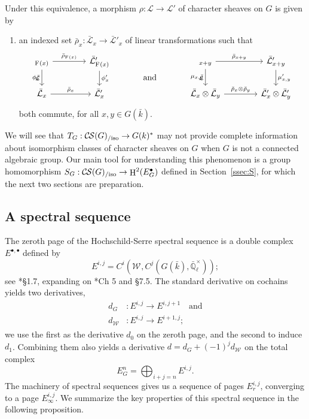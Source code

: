 \documentclass[10pt]{amsart}
\makeatletter
\theoremstyle{plain}
\theoremstyle{definition}
\theoremstyle{remark}
\newcommand{\EE}{\mathbb{\bar Q}_\ell}
\newcommand{\bFq}{\bar{k}}
\newcommand{\Fq}{k}
\newcommand{\EEx}{\EE^\times}
\newcommand{\Weil}[1]{\mathcal{W}_{#1}}
\newcommand{\Frob}[1]{\operatorname{F}_{#1}}
\DeclareMathOperator{\Hh}{H}
\newcommand{\TrFrob}[1]{T_{#1}}
\newcommand{\cs}[1]{{\mathcal{#1}}}
\newcommand{\gcs}[1]{{\mathcal{\bar #1}}}
\newcommand{\CS}{{\mathcal{C\hskip-0.8pt S}}}
\newcommand{\CSiso}[1]{\CS(#1)_{/\text{iso}}}
\newcommand{\labitem}[2]{
\def\@itemlabel{\textbf{#1}}
\item
\def\@currentlabel{#1}\label{#2}}
\newcommand{\brho}{{\bar\rho}}
\makeatother
\begin{document}
Under this equivalence, a morphism $\rho : \cs{L} \to \cs{L'}$ of character sheaves on $G$ is given by
\begin{enumerate}
 \labitem{(cs.4)}{cs.4} an indexed set $\brho_x : \gcs{L}_x \to \gcs{L'}_x$
  of linear transformations such that
  \[
   \begin{tikzcd}[column sep=40]
    \arrow[swap]{d}{\phi_x} \gcs{L}_{\Frob{}(x)} \rar{\brho_{\Frob{}(x)}} & \gcs{L'}_{\Frob{}(x)} \dar{\phi_x'}
    &\arrow[draw=none]{d}[pos=.4,description]{\text{\normalsize{and}}}
    & \arrow[swap]{d}{\mu_{x,y}} \gcs{L}_{x+y} \rar{\brho_{x+y}} & \gcs{L'}_{x+y} \dar{\mu'_{x,y}} \\
    \gcs{L}_x \rar{\brho_x} & \gcs{L'}_x
    & {} & \gcs{L}_x\otimes\gcs{L}_y \rar{\brho_x\otimes\brho_y} & \gcs{L'}_x \otimes\gcs{L'}_y
   \end{tikzcd}
  \]
  both commute, for all $x, y \in G(\bFq)$.
\end{enumerate}

We will see that $\TrFrob{G} : \CSiso{G} \to G(\Fq)^*$ may not provide complete
information about isomorphism classes of character sheaves on $G$ when $G$ is not a connected algebraic group.
Our main tool for understanding this phenomenon
is a group homomorphism $S_G: \CSiso{G} \to \Hh^2(E^\bullet_G)$ defined in Section~\ref{ssec:S}, for which the next two sections are preparation.

\subsection{A spectral sequence}\label{ssec:E}

The zeroth page of the Hochschild-Serre spectral sequence
is a double complex $E^{\bullet, \bullet}$ defined by
\[
E^{i,j} = C^i(\Weil{}, C^j(G(\bFq), \EEx));
\]
see \cite{vakil:Algebraic_Geometry}*{\S 1.7}, expanding on \cite{weibel:Homological_Algebra}*{Ch 5 and \S 7.5}.
The standard derivative on cochains yields two derivatives,
\begin{align*}
d_G &: E^{i,j} \to E^{i,j+1} \quad \mbox{and} \\
d_{\Weil{}} &: E^{i,j} \to E^{i+1,j};
\end{align*}
we use the first as the derivative $d_0$ on the zeroth page, and the second to induce $d_1$.
Combining them also yields a derivative $d = d_G + (-1)^j d_{\Weil{}}$ on the total complex
\[
E^n_G = \bigoplus_{i+j=n} E^{i,j}.
\]
The machinery of spectral sequences gives us a sequence of pages $E_r^{i,j}$, converging to a page $E_{\infty}^{i,j}$. We summarize the key properties of this spectral sequence in the following proposition.
\end{document}
